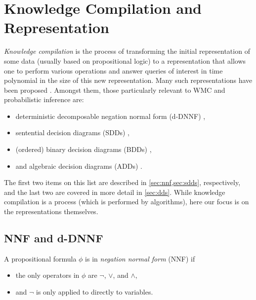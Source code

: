 \section{Knowledge Compilation and Representation}\label{sec:kc}

\emph{Knowledge compilation} is the process of transforming the initial
representation of some data (usually based on propositional logic) to a
representation that allows one to perform various operations and answer queries
of interest in time polynomial in the size of this new representation. Many such
representations have been proposed \citep{DBLP:journals/jair/DarwicheM02}.
Amongst them, those particularly relevant to WMC and probabilistic inference
are:
\begin{itemize}
  \item deterministic decomposable negation normal form (d-DNNF)
        \citep{DBLP:journals/jancl/Darwiche01},
  \item sentential decision diagrams (SDDs) \citep{DBLP:conf/ijcai/Darwiche11},
  \item (ordered) binary decision diagrams (BDDs)
        \citep{DBLP:journals/tc/Bryant86},
  \item and algebraic decision diagrams (ADDs)
        \citep{DBLP:journals/fmsd/BaharFGHMPS97}.
\end{itemize}
The first two items on this list are described in \cref{sec:nnf,sec:sdds},
respectively, and the last two are covered in more detail in \cref{sec:dds}.
While knowledge compilation is a process (which is performed by algorithms),
here our focus is on the representations themselves.

\subsection{NNF and d-DNNF}\label{sec:nnf}

\begin{definition}
  A propositional formula $\phi$ is in \emph{negation normal form} (NNF) if
  \begin{itemize}
    \item the only operators in $\phi$ are $\neg$, $\lor$, and $\land$,
    \item and $\neg$ is only applied to directly to variables.
  \end{itemize}
\end{definition}

